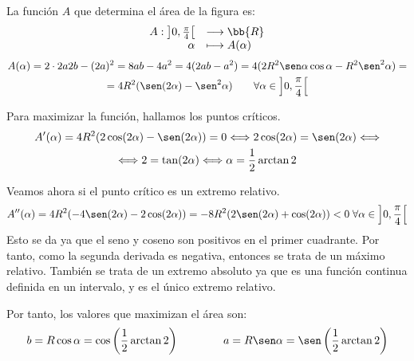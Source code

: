 \begin{ejercicio}
    La función $A$ que determina el área de la figura es:
        \begin{equation*}
            \begin{array}{rl}
               A:\left]0, \frac{\pi}{4} \right[ & \longrightarrow \bb{R}\\
                        \alpha & \longmapsto A(\alpha)
            \end{array}
        \end{equation*}
        \begin{multline*}
             A(\alpha) = 2\cdot 2a2b - (2a)^2 = 8ab - 4a^2 = 4(2ab - a^2) = 4(2R^2\sen \alpha \cos \alpha - R^2\sen ^2\alpha)
             =\\=
             4R^2(\sen (2\alpha) - \sen^2\alpha) \qquad \forall \alpha \in \left]0, \frac{\pi}{4} \right[
        \end{multline*}

        Para maximizar la función, hallamos los puntos críticos.
        \begin{multline*}
            A'(\alpha) = 4R^2(2\cos(2\alpha) -\sen(2\alpha)) = 0 \Longleftrightarrow 2\cos(2\alpha) = \sen(2\alpha) 
            \Longleftrightarrow \\ \Longleftrightarrow 
            2 = \tan (2\alpha) \Longleftrightarrow \alpha = \frac{1}{2} \arctan 2
        \end{multline*}

        Veamos ahora si el punto crítico es un extremo relativo.
        \begin{equation*}
            A''(\alpha) = 4R^2(-4\sen(2\alpha) - 2\cos(2\alpha)) = -8R^2(2\sen(2\alpha) + \cos(2\alpha)) <0 \; \forall \alpha \in \left]0, \frac{\pi}{4} \right[
        \end{equation*}
        Esto se da ya que el seno y coseno son positivos en el primer cuadrante. Por tanto, como la segunda derivada es negativa, entonces se trata de un máximo relativo. También se trata de un extremo absoluto ya que es una función continua definida en un intervalo, y es el único extremo relativo.

        Por tanto, los valores que maximizan el área son:
        \begin{equation*}
            b = R\cos \alpha = \cos \left( \frac{1}{2} \arctan 2 \right)
        \qquad \qquad
            a = R\sen \alpha = \sen \left( \frac{1}{2} \arctan 2 \right)
        \end{equation*}
\end{ejercicio}